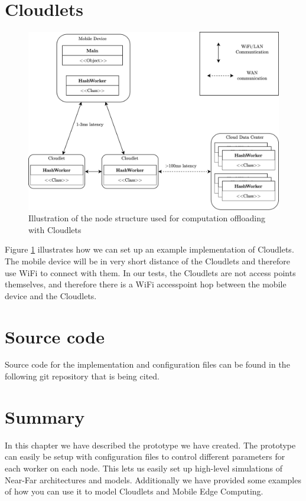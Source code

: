 \section{Cloudlets}
\begin{figure}[t]
    \centering
    \includegraphics[scale=0.9]{chapters/5_implementation/figures/Cloudlet_implementation.png}
    \caption{Illustration of the node structure used for computation offloading with Cloudlets}
    \label{fig:Cloudlet_implementation}
\end{figure}
Figure \ref{fig:Cloudlet_implementation} illustrates how we can set up an example implementation of Cloudlets. The mobile device will be in very short distance of the Cloudlets and therefore use WiFi to connect with them. In our tests, the Cloudlets are not access points themselves, and therefore there is a WiFi accesspoint hop between the mobile device and the Cloudlets.






\section{Source code}
Source code for the implementation and configuration files can be found in the following git repository that is being cited\cite{johnsen_daniejohmasterprograms_nodate}.






\section{Summary}
In this chapter we have described the prototype we have created. The prototype can easily be setup with configuration files to control different parameters for each worker on each node. This lets us easily set up high-level simulations of Near-Far architectures and models. Additionally we have provided some examples of how you can use it to model Cloudlets and Mobile Edge Computing.